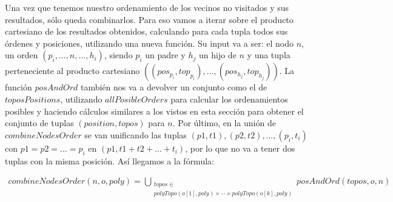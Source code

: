 Una vez que tenemos nuestro ordenamiento de los vecinos no visitados y sus resultados, sólo queda combinarlos. Para eso vamos a iterar sobre el producto cartesiano de los resultados obtenidos, calculando para cada tupla todos sus órdenes y posiciones, utilizando una nueva función. Su input va a ser: el nodo $n$, un orden $(p_i, \dots, n , \dots, h_i)$, siendo $p_i$ un padre y $h_j$ un hijo de $n$ y una tupla perteneciente al producto cartesiano $((pos_{p_i}, top_{p_i}), \dots , (pos_{h_j}, top_{h_j}))$. La función $posAndOrd$ también nos va a devolver un conjunto como el de $toposPositions$, utilizando $allPosibleOrders$ para calcular los ordenamientos posibles y haciendo cálculos similares a los vistos en esta sección para obtener el conjunto de tuplas $(position, topos)$ para $n$. Por último, en la unión de $combineNodesOrder$ se van unificando las tuplas $(p1, t1), (p2,t2), \dots ,(p_i,t_i)$ con $p1=p2=\dots=p_i$ en $(p1, t1+t2+\dots+t_i)$, por lo que no va a tener dos tuplas con la misma posición. Así llegamos a la fórmula: 

\begin{align}
\label{formula:combineNeighboursInOrder} 
combineNodesOrder(n, o, poly) = 
\bigcup_{\substack{
    topos \in \\
    polyTopo(o[1], poly) \times \cdots \times polyTopo(o[k], poly)
}} 
posAndOrd(topos, o, n)
\end{align}


